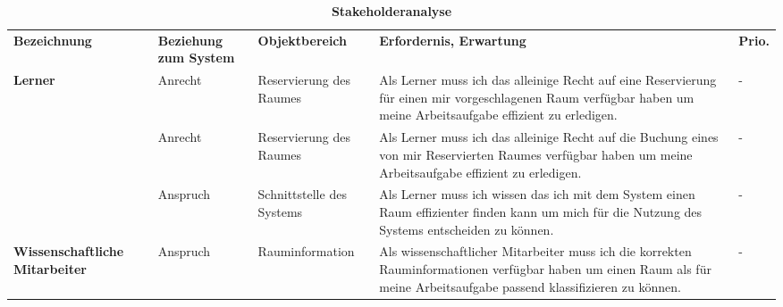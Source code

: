 \begin{table}
	
 	\caption{\textbf{Stakeholderanalyse}}
 	\begin{tabularx}{\textwidth}{|X|X|X|X|m{}|}			
 		\rowcolor{heading}\textbf{Bezeichnung} & \textbf{Beziehung zum System} & \textbf{Objektbereich} & \textbf{Erfordernis, Erwartung} & \textbf{Prio.}\\
			 
 	\textbf{Lerner} & Anrecht & Reservierung des Raumes & Als Lerner muss ich das alleinige Recht auf eine Reservierung für einen mir vorgeschlagenen Raum verfügbar haben um meine Arbeitsaufgabe effizient zu erledigen. & -\\
\rowcolor{odd}		 & Anrecht & Reservierung des Raumes & Als Lerner muss ich das alleinige Recht auf die Buchung eines von mir Reservierten Raumes verfügbar haben um meine Arbeitsaufgabe effizient zu erledigen. & -\\
	& Anspruch & Schnittstelle des Systems & Als Lerner muss ich wissen das ich mit dem System einen Raum effizienter finden kann um mich für die Nutzung des Systems entscheiden zu können. & -\\
\rowcolor{odd} \textbf{Wissenschaftliche Mitarbeiter} & Anspruch & Rauminformation & Als wissenschaftlicher Mitarbeiter muss ich die korrekten Rauminformationen verfügbar haben um einen Raum als für meine Arbeitsaufgabe passend klassifizieren zu können. & -\\ \hline
 	\end{tabularx}
 	
\end{table}


